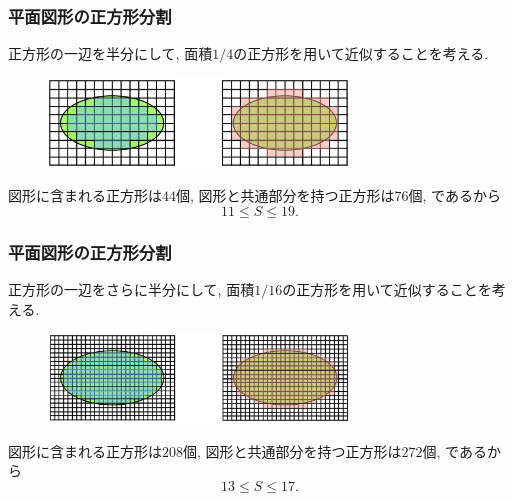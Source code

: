 \documentclass[dvipdfmx,cjk,10.2pt]{beamer}
\theoremstyle{definition}
\begin{document}
\begin{frame}
\frametitle{平面図形の正方形分割}
正方形の一辺を半分にして, 面積$1/4$の正方形を用いて近似することを考える. 

\begin{figure}[htbp]
 \begin{center} 
  \includegraphics[width=80mm]{cover2.png}
 \end{center}
\end{figure}

図形に含まれる正方形は$44$個, 図形と共通部分を持つ正方形は$76$個, であるから
$$
11 \le S \le 19. 
$$

\end{frame}




\begin{frame}
\frametitle{平面図形の正方形分割}
正方形の一辺をさらに半分にして, 面積$1/16$の正方形を用いて近似することを考える. 

\begin{figure}[htbp]
 \begin{center} 
  \includegraphics[width=80mm]{cover3.png}
 \end{center}
\end{figure}

図形に含まれる正方形は$208$個, 図形と共通部分を持つ正方形は$272$個, であるから
$$
13 \le S \le 17. 
$$

\end{frame}




\end{document}
